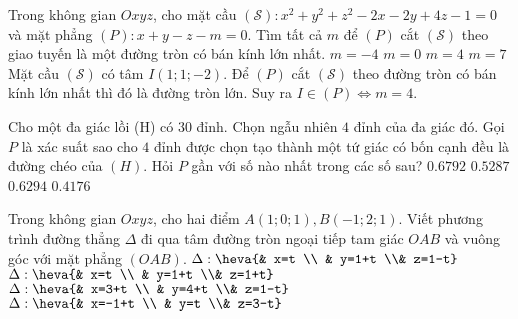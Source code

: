 \begin{ex}%
Trong không gian $Oxyz$, cho mặt cầu $(\mathcal{S}): x^2+y^2+z^2-2x-2y+4z-1=0$ và mặt phẳng $(P): x+y-z-m=0$. Tìm tất cả $m$ để $(P)$ cắt $(\mathcal{S})$ theo giao tuyến là một đường tròn có bán kính lớn nhất.
\choice
{$m=-4$}
{$m=0$}
{\True $m=4$}
{$m=7$}
\loigiai
{
Mặt cầu $(\mathcal{S})$ có tâm $I(1;1;-2)$. Để $(P)$ cắt $(\mathcal{S})$ theo đường tròn có bán kính lớn nhất thì đó là đường tròn lớn. Suy ra $I \in (P) \Leftrightarrow m=4$.
}
	\end{ex}
\begin{ex}%
Cho một đa giác lồi (H) có $30$ đỉnh. Chọn ngẫu nhiên $4$ đỉnh của đa giác đó. Gọi $P$ là xác suất sao cho $4$ đỉnh được chọn tạo thành một tứ giác có bốn cạnh đều là đường chéo của $(H)$. Hỏi $P$ gần với số nào nhất trong các số sau?
	\choice
	{$0.6792$}
	{$0.5287$}
	{\True $0.6294$}
	{$0.4176$}
\end{ex}
\begin{ex}%
	Trong không gian $Oxyz$, cho hai điểm $A(1;0;1), B(-1;2;1)$. Viết phương trình đường thẳng $\Delta$ đi qua tâm đường tròn ngoại tiếp tam giác $OAB$ và vuông góc với mặt phẳng $(OAB)$.
	\choice
	{\True $\Delta: \heva{& x=t \\ & y=1+t \\& z=1-t}$}
		{$\Delta: \heva{& x=t \\ & y=1+t \\& z=1+t}$}
			{$\Delta: \heva{& x=3+t \\ & y=4+t \\& z=1-t}$}
				{$\Delta: \heva{& x=-1+t \\ & y=t \\& z=3-t}$}
	\end{ex}
